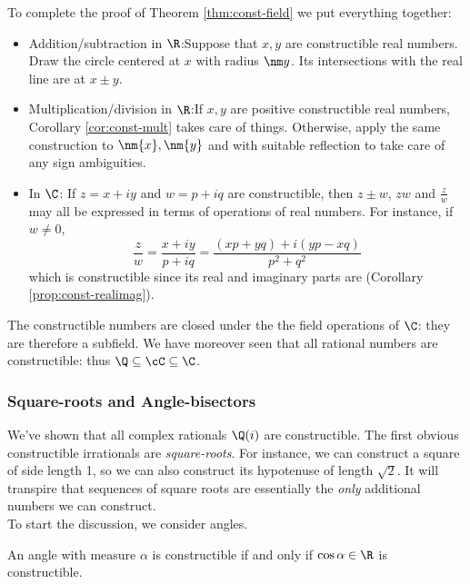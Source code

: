 To complete the proof of Theorem \ref{thm:const-field} we put everything together:

\begin{itemize}
  \item Addition/subtraction in $\R$:\quad Suppose that $x,y$ are constructible real numbers. Draw the circle centered at $x$ with radius $\nm y$. Its intersections with the real line are at $x\pm y$.
  \item Multiplication/division in $\R$:\quad If $x,y$ are positive constructible real numbers, Corollary \ref{cor:const-mult} takes care of things. Otherwise, apply the same construction to $\nm{x},\nm{y}$ and with suitable reflection to take care of any sign ambiguities.
  \item In $\C$: If $z=x+iy$ and $w=p+iq$ are constructible, then $z\pm w$, $zw$ and $\frac zw$ may all be expressed in terms of operations of real numbers. For instance, if $w\neq 0$,
  \[\frac zw=\frac{x+iy}{p+iq}=\frac{(xp+yq)+i(yp-xq)}{p^2+q^2}\]
  which is constructible since its real and imaginary parts are (Corollary \ref{prop:const-realimag}).
\end{itemize}
The constructible numbers are closed under the the field operations of $\C$: they are therefore a subfield.
We have moreover seen that all rational numbers are constructible: thus $\Q\subseteq\cC\subseteq\C$.


\subsubsection*{Square-roots and Angle-bisectors}

We've shown that all complex rationals $\Q(i)$ are constructible. The first obvious constructible irrationals are \emph{square-roots}. For instance, we can construct a square of side length 1, so we can also construct its hypotenuse of length $\sqrt 2$. It will transpire that sequences of square roots are essentially the \emph{only} additional numbers we can construct.\\

To start the discussion, we consider angles.

\begin{prop}
An angle with measure $\alpha$ is constructible if and only if $\cos\alpha\in\R$ is constructible.
\end{prop}

